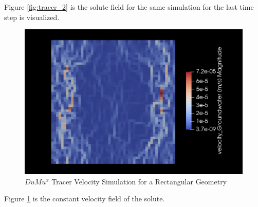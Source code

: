Figure \ref{fig:tracer_2} is the solute field for the same simulation for the last time step is visualized.\\
\begin{figure}[h]
\centering
\includegraphics[width=162mm]{tracer_velocity}
\caption{\footnotesize $DuMu^x$ Tracer Velocity Simulation for a Rectangular Geometry}
\label{fig:tracer_velocity}
\end{figure}
Figure \ref{fig:tracer_velocity} is the constant velocity field of the solute.\\